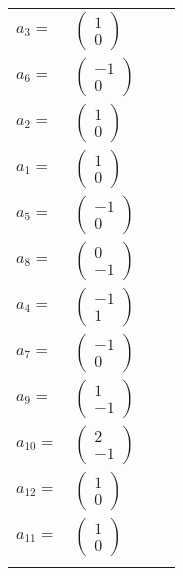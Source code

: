 \documentclass[1p]{elsarticle_modified}
\theoremstyle{definition}
\begin{document}
\begin{tabular}{m{7pt} m{180pt} m{7pt} m{180pt} }
\flushright $a_{3}=$&$\begin{pmatrix}1\\0\end{pmatrix}$ \\
\flushright $a_{6}=$&$\begin{pmatrix}-1\\0\end{pmatrix}$ \\
\flushright $a_{2}=$&$\begin{pmatrix}1\\0\end{pmatrix}$ \\
\flushright $a_{1}=$&$\begin{pmatrix}1\\0\end{pmatrix}$ \\
\flushright $a_{5}=$&$\begin{pmatrix}-1\\0\end{pmatrix}$ \\
\flushright $a_{8}=$&$\begin{pmatrix}0\\-1\end{pmatrix}$ \\
\flushright $a_{4}=$&$\begin{pmatrix}-1\\1\end{pmatrix}$ \\
\flushright $a_{7}=$&$\begin{pmatrix}-1\\0\end{pmatrix}$ \\
\flushright $a_{9}=$&$\begin{pmatrix}1\\-1\end{pmatrix}$ \\
\flushright $a_{10}=$&$\begin{pmatrix}2\\-1\end{pmatrix}$ \\
\flushright $a_{12}=$&$\begin{pmatrix}1\\0\end{pmatrix}$ \\
\flushright $a_{11}=$&$\begin{pmatrix}1\\0\end{pmatrix}$\\&\end{tabular}
\end{document}
